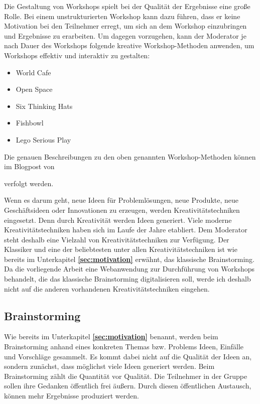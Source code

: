 Die Gestaltung von Workshops spielt bei der Qualität der Ergebnisse eine große Rolle. Bei einem unstrukturierten Workshop kann dazu führen, dass er keine Motivation bei den Teilnehmer erregt, um sich an dem Workshop einzubringen und Ergebnisse zu erarbeiten. Um dagegen vorzugehen, kann der Moderator je nach Dauer des Workshops folgende kreative Workshop-Methoden anwenden, um Workshops effektiv und interaktiv zu gestalten:

\begin{itemize} 
\item World Cafe
\item Open Space
\item Six Thinking Hats
\item Fishbowl
\item Lego Serious Play
\end{itemize}
\medskip
Die genauen Beschreibungen zu den oben genannten Workshop-Methoden können im Blogpost von \par \cite{Cho2018} verfolgt werden.\bigskip
 
Wenn es darum geht, neue Ideen für Problemlösungen, neue Produkte, neue Geschäftsideen oder Innovationen zu erzeugen, werden Kreativitätstechniken eingesetzt. Denn durch Kreativität werden Ideen generiert. Viele moderne Kreativitätstechniken haben sich im Laufe der Jahre etabliert. Dem Moderator steht deshalb eine Vielzahl von Kreativitätstechniken zur Verfügung. Der Klassiker und eine der beliebtesten unter allen Kreativitätstechniken ist wie bereits im Unterkapitel \textbf{\ref{sec:motivation}} erwähnt, das klassische Brainstorming. Da die vorliegende Arbeit eine Webanwendung zur Durchführung von Workshops behandelt, die das klassische Brainstorming digitalisieren soll, werde ich deshalb nicht auf die anderen vorhandenen Kreativitätstechniken eingehen. 

\newpage
\subsection{Brainstorming}
\label{sec:brainstorming}
Wie bereits im Unterkapitel \textbf{\ref{sec:motivation}} benannt, werden beim Brainstorming anhand eines konkreten Themas bzw. Problems Ideen, Einfälle und Vorschläge gesammelt. Es kommt dabei nicht auf die Qualität der Ideen an, sondern zunächst, dass möglichst viele Ideen generiert werden. Beim Brainstorming zählt die Quantität vor Qualität. Die Teilnehmer in der Gruppe sollen ihre Gedanken öffentlich frei äußern. Durch diesen öffentlichen Austausch, können mehr Ergebnisse produziert werden.\bigskip

